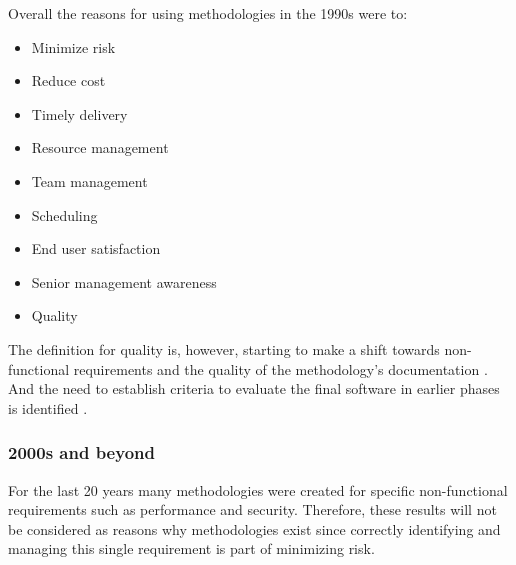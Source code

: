 Overall the reasons for using methodologies in the 1990s were to:
\begin{itemize}
    \item Minimize risk \cite{drake_1991, trussel_1999}
    \item Reduce cost \cite{drake_1991, scarre_1992, paul_1993}
    \item Timely delivery \cite{drake_1991, scarre_1992, herald_1993, trussel_1999}
    \item Resource management \cite{drake_1991}
    \item Team management \cite{drake_1991}
    \item Scheduling \cite{drake_1991, paul_1993}
    \item End user satisfaction \cite{drake_1991}
    \item Senior management awareness \cite{drake_1991}
    \item Quality \cite{drake_1991, scarre_1992, herald_1993, trussel_1999}
\end{itemize}

The definition for quality is, however, starting to make a shift towards non-functional requirements and the quality of the methodology's documentation \cite{scarre_1992}.
And the need to establish criteria to evaluate the final software in earlier phases is identified \cite{paul_1993, herald_1993, grossman_1997}.


\subsubsection{2000s and beyond}
For the last 20 years many methodologies were created for specific non-functional requirements such as performance and security.
Therefore, these results will not be considered as reasons why methodologies exist since correctly identifying and managing this single requirement is part of minimizing risk.

